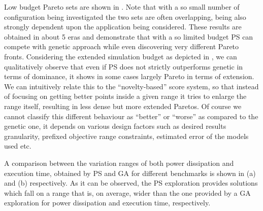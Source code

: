 Low budget Pareto sets are shown in . Note
that with a so small number of configuration being investigated the
two sets are often overlapping, being also strongly dependent upon the
application being considered.  These results are obtained in about 5
eras and demonstrate that with a so limited budget PS can compete with
genetic approach while even discovering very different Pareto fronts.
Considering the extended simulation budget as depicted in
, we can qualitatively observe that even if PS
does not strictly outperforms genetic in terms of dominance, it shows
in some cases largely Pareto in terms of extension. We can intuitively
relate this to the ``novelty-based'' score system, so that instead of
focusing on getting better points inside a given range it tries to
enlarge the range itself, resulting in less dense but more extended
Paretos. Of course we cannot classify this different behaviour as
``better'' or ``worse'' as compared to the genetic one, it depends on
various design factors such as desired results granularity, prefixed
objective range constraints, estimated error of the models used etc.

A comparison between the variation ranges of both power dissipation
and execution time, obtained by PS and GA for different benchmarks is
shown in (a) and (b) respectively.  As it can
be observed, the PS exploration provides solutions which fall on a
range that is, on average, wider than the one provided by a GA
exploration for power dissipation and execution time, respectively.

\begin{figure}
  \begin{center}
  \end{center}
\end{figure}

